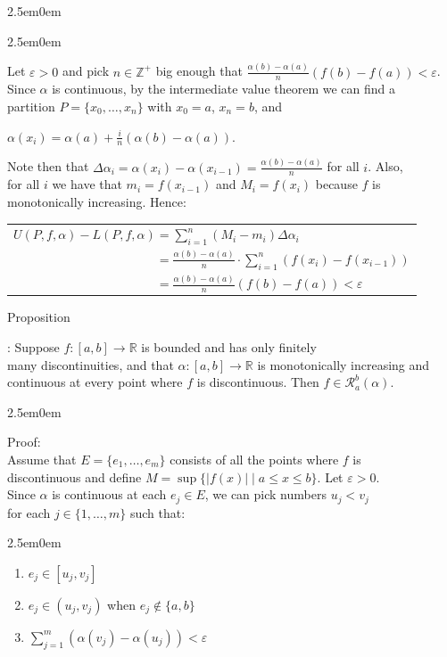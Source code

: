 \documentclass{book}
\newcommand{\hThree}{%
   \color{PineGreen!85!Orange}
   \fontsize{13}{15}\selectfont%
}
\newenvironment{myIndent}{%
   \begin{adjustwidth}{2.5em}{0em}%
}{%
   \end{adjustwidth}%
}
\newcounter{PropNumber}
\newcommand{\propCount}[1][1]{%
   \addtocounter{PropNumber}{#1}%
   \thePropNumber%
}
\newcommand{\retTwo}{\hfill\bigbreak}
\begin{document}
{\begin{myIndent}
{\begin{myIndent}
      Let $\varepsilon > 0$ and pick $n \in \mathbb{Z}^+$ big enough that $\frac{\alpha(b) - \alpha(a)}{n}\left(f(b) - f(a)\right) < \varepsilon$.\\ Since $\alpha$ is continuous, by the intermediate value theorem we can find a\\ partition $P = \{x_0, \ldots, x_n\}$ with $x_0 = a$, $x_n = b$, and

      {\centering $\alpha(x_i) = \alpha(a) + \frac{i}{n}(\alpha(b) - \alpha(a))$.\par}

      \newpage

      Note then that $\Delta \alpha_i = \alpha(x_i) - \alpha(x_{i-1}) = \frac{\alpha(b)- \alpha(a)}{n}$ for all $i$. Also,\\ for all $i$ we have that $m_i = f(x_{i-1})$ and $M_i = f(x_i)$ because $f$ is\\ monotonically increasing. Hence:\\
      \begin{tabular}{l}
         $U(P, f, \alpha) - L(P, f, \alpha) = \sum\limits_{i=1}^n(M_i - m_i)\Delta \alpha_i$ \\ [4pt]
         $\phantom{U(P, f, \alpha) - L(P, f, \alpha)} = \frac{\alpha(b) - \alpha(a)}{n}\cdot \sum\limits_{i=1}^n(f(x_{i}) - f(x_{i-1}))$\\ [4pt]
         $\phantom{U(P, f, \alpha) - L(P, f, \alpha)} = \frac{\alpha(b) - \alpha(a)}{n}\left(f(b) - f(a)\right) < \varepsilon$\retTwo\retTwo
      \end{tabular}
   \end{myIndent}}

   Proposition \propCount: Suppose $f: [a, b] \longrightarrow \mathbb{R}$ is bounded and has only finitely\\ many discontinuities, and that $\alpha: [a, b] \longrightarrow \mathbb{R}$ is monotonically increasing and\\ continuous at every point where $f$ is discontinuous. Then $f \in \mathscr{R}_a^b(\alpha)$.
   
   {\begin{myIndent}\hThree
      Proof:\\
      Assume that $E = \{e_1, \ldots, e_m\}$ consists of all the points where $f$ is\\ discontinuous and define $M = \sup\{|f(x)| \mid a \leq x \leq b\}$. Let $\varepsilon > 0$.\\ Since $\alpha$ is continuous at each $e_j \in E$, we can pick numbers $u_j  < v_j$\\ for each $j \in \{1, \ldots, m\}$ such that:
      \begin{myIndent}\begin{enumerate}
            \item $e_j \in [u_j, v_j]$
            \item $e_j \in (u_j, v_j)$ when $e_j \notin \{a, b\}$
            \item $\sum\limits_{j=1}^m\left(\alpha(v_j) - \alpha(u_j)\right) < \varepsilon$\retTwo
      \end{enumerate}\end{myIndent}


\end{myIndent}}
\end{myIndent}}
\end{document}

